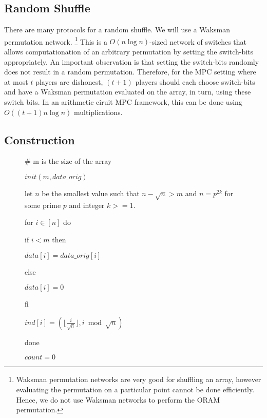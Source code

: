 \subsection{Random Shuffle}

There are many protocols for a random shuffle.
We will use a Waksman permutation network.
\footnote{Waksman permutation networks are very good for shuffling an array,
however evaluating the permutation on a particular point cannot be done
efficiently. Hence, we do not use Waksman networks to perform the ORAM permutation.}
This is a $O(n \log{n})$-sized network of switches that allows computationation
of an arbitrary permutation by setting the switch-bits appropriately.
An important observation is that setting the switch-bits randomly
does not result in a random permutation.
Therefore, for the MPC setting where at most $t$ players are dishonest,
$(t+1)$ players should each choose switch-bits and have a Waksman permutation
evaluated on the array, in turn, using these switch bits.  
In an arithmetic ciruit MPC framework, this can be done using $O( (t+1) n \log{n})$ 
multiplications.


\subsection{Construction}


\begin{figure}
\begin{framed}

\# m is the size of the array

$init(m, data\_orig)$

let $n$ be the smallest value such that
$n - \sqrt{n} > m$ and $n = p^{2k}$ for some prime $p$ and integer $k >=1$.

for $i \in [n]$ do

   if $i < m$ then

   $data[i] = data\_orig[i]$

   else

   $data[i] = 0$

   fi

   $ind[i]  = (\lfloor{ \frac{i}{\sqrt{n}}} \rfloor ,  i \bmod \sqrt{n}) $

done

$count = 0$

\end{framed}
\end{figure}


